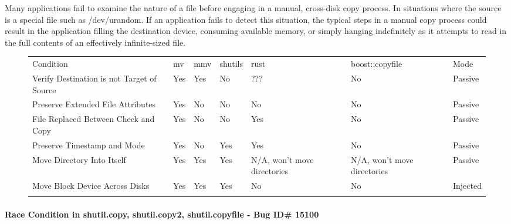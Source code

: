         Many applications fail to examine the nature of a file before engaging in a manual, cross-disk copy process.  In
        situations where the source is a special file such as /dev/urandom.  If an application fails to detect this
        situation, the typical steps in a manual copy process could result in the application filling the destination
        device, consuming available memory, or simply hanging indefinitely as it attempts to read in the full contents
        of an effectively infinite-sized file.

\begin{figure*}[t]
        \scriptsize{}
        \begin{tabular}{l l l l l l | l}
        \toprule{}
          Condition & mv & mmv & shutils & rust & boost::copyfile & Mode\\
          Verify Destination is not Target of Source & Yes & Yes & No & ??? & No & Passive\\
          Preserve Extended File Attributes & Yes & No & No & No & No & Passive\\
          File Replaced Between Check and Copy & Yes & No & No & Yes & No & Passive\\
          Preserve Timestamp and Mode & Yes & No & Yes & Yes & No & Passive\\
          Move Directory Into Itself & Yes & Yes & Yes & N/A, won't move directories & N/A, won't move directories & Passive\\
          Move Block Device Across Disks & Yes & Yes & Yes & No & No & Injected\\
        \bottomrule{}
        \end{tabular}
\end{figure*}



    \paragraph{Race Condition in shutil.copy, shutil.copy2, shutil.copyfile - Bug ID\# 15100}
      
